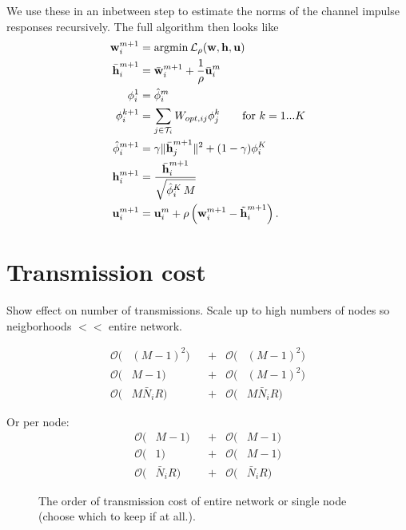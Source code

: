 \documentclass{article}
\begin{document}
We use these in an inbetween step to estimate the norms of the channel impulse responses recursively. The full algorithm then looks like
\begin{align}
  \bm{\mathrm{w}}_i^{m+1} &= \operatorname{argmin} \mathcal{L}_\rho(\bm{\mathrm{w}},\bm{\mathrm{h}},\bm{\mathrm{u}})\\
  \bar{\bm{\mathrm{h}}}_i^{m+1} &= \bar{\bm{\mathrm{w}}}_i^{m+1} + \frac{1}{\rho} \bar{\bm{\mathrm{u}}}_i^m\\
  \phi_i^1 &= \hat{\phi}_i^{m}\\
  \phi_i^{k+1} &= \sum_{j \in \mathcal{T}_i} W_{opt,ij} \phi_j^{k} \qquad\text{for } k=1...K\\
  \hat{\phi}_i^{m+1} &= \gamma \| \bar{\bm{\mathrm{h}}}_j^{m+1} \|^2 + (1-\gamma) \phi_i^K\\
  \bm{\mathrm{h}}_i^{m+1} &= \frac{\bar{\bm{\mathrm{h}}}_i^{m+1}}{\sqrt{\hat{\phi}_i^K\,M}}\\
  \bm{\mathrm{u}}_i^{m+1} &= \bm{\mathrm{u}}_i^{m} + \rho \left(\bm{\mathrm{w}}_i^{m+1} - \tilde{\bm{\mathrm{h}}}_i^{m+1}\right).
\end{align}

\section{Transmission cost}
\label{sec:transcost}
Show effect on number of transmissions. Scale up to high numbers of nodes so neigborhoods \(<<\) entire network.

\begin{align}
  \mathcal{O}(&(M-1)^2) & &+ & \mathcal{O}(&(M-1)^2)\\
  \mathcal{O}(&M-1) & &+ & \mathcal{O}(&(M-1)^2)\\
  \mathcal{O}(&M \bar{N}_i R) & &+ & \mathcal{O}(&M \bar{N}_i R)
\end{align}

Or per node:
\begin{align}
  \mathcal{O}(&M-1) & &+ & \mathcal{O}(&M-1)\\
  \mathcal{O}(&1) & &+ & \mathcal{O}(&M-1)\\
  \mathcal{O}(&\bar{N}_i R) & &+ & \mathcal{O}(&\bar{N}_i R)
\end{align}

\begin{figure}
  \centering
  
  
  \vspace*{-0.8cm}
  \caption[]{The order of transmission cost of entire network or single node (choose which to keep if at all.).}
  \label{fig:transcost:bigo}
\end{figure}
\end{document}
